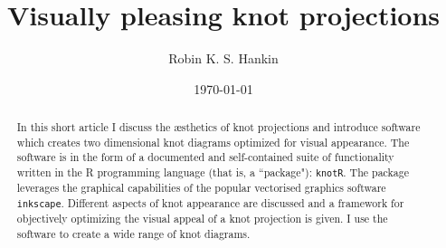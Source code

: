 \documentclass{birkjour}
\theoremstyle{definition}
\theoremstyle{remark}
\numberwithin{equation}{section}
\begin{document}
%
%
%
%
%
%
%
%
%


\title[Visually pleasing knot projections]{Visually pleasing knot projections}




\author[Hankin]{Robin K. S. Hankin}

\address{%
55 Wellesley Street East, Auckland 1010, New Zealand}




\date{\today}

\begin{abstract}
In this short article I discuss the \ae sthetics of knot projections
and introduce software which creates two dimensional knot diagrams
optimized for visual appearance.  The software is in the form of a
documented and self-contained suite of functionality written in the R
programming language (that is, a ``package"): {\tt knotR}.  The
package leverages the graphical capabilities of the popular vectorised
graphics software {\tt inkscape}.  Different aspects of knot
appearance are discussed and a framework for objectively optimizing
the visual appeal of a knot projection is given.  I use the software
to create a wide range of knot diagrams.
\end{abstract}

\maketitle
\end{document}
